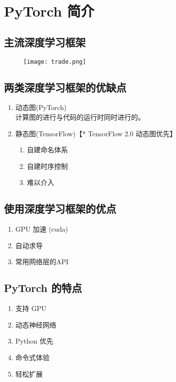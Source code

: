 \section{PyTorch 简介}
\subsection{主流深度学习框架}
\begin{figure}[!h]
  \centering
  \texttt{[image: trade.png]}
\end{figure}

\subsection{两类深度学习框架的优缺点}
\begin{enumerate}
  \item 动态图(PyTorch)\\
  计算图的进行与代码的运行时同时进行的。
  \item 静态图(TensorFlow)【* TensorFlow 2.0 动态图优先】
  \begin{enumerate}
    \item 自建命名体系
    \item 自建时序控制
    \item 难以介入
  \end{enumerate}
\end{enumerate}

\subsection{使用深度学习框架的优点}
\begin{enumerate}
  \item GPU 加速  (cuda)
  \item 自动求导
  \item 常用网络层的API\\

\end{enumerate}

\subsection{PyTorch 的特点}
\begin{enumerate}
  \item 支持 GPU
  \item 动态神经网络
  \item Python 优先
  \item 命令式体验
  \item 轻松扩展
\end{enumerate}

